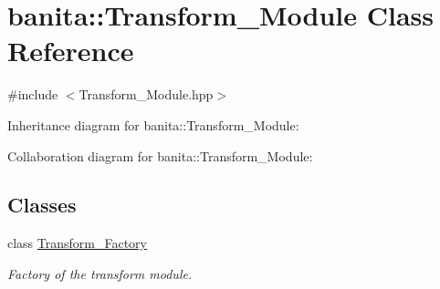 \hypertarget{classbanita_1_1_transform___module}{}\section{banita\+::Transform\+\_\+\+Module Class Reference}
\label{classbanita_1_1_transform___module}


{\ttfamily \#include $<$Transform\+\_\+\+Module.\+hpp$>$}



Inheritance diagram for banita\+::Transform\+\_\+\+Module\+:


Collaboration diagram for banita\+::Transform\+\_\+\+Module\+:
\subsection*{Classes}
\begin{DoxyCompactItemize}
\item 
class \mbox{\hyperlink{classbanita_1_1_transform___module_1_1_transform___factory}{Transform\+\_\+\+Factory}}
\begin{DoxyCompactList}\small\item\em Factory of the transform module. \end{DoxyCompactList}\end{DoxyCompactItemize}
